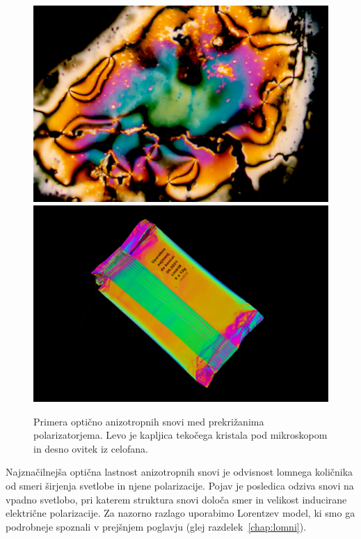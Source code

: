 \begin{figure}[ht]
\centering
\includegraphics[width=7truecm]{slike/10_foto_nematik.jpg}\hfill
\includegraphics[width=7truecm]{slike/10_foto_celofan.jpg}
\caption{Primera optično anizotropnih snovi med prekrižanima polarizatorjema.
Levo je kapljica tekočega kristala pod mikroskopom in desno 
ovitek iz celofana.}
\label{fig:10_nematik}
\end{figure}

Najznačilnejša optična lastnost anizotropnih snovi je odvisnost lomnega
količnika od smeri širjenja svetlobe in njene polarizacije. Pojav
je posledica odziva snovi na vpadno svetlobo, pri katerem struktura snovi
določa smer in velikost inducirane električne polarizacije.  
Za nazorno razlago uporabimo Lorentzev model, ki smo ga podrobneje spoznali v prejšnjem 
poglavju (glej razdelek~\ref{chap:lomni}).

